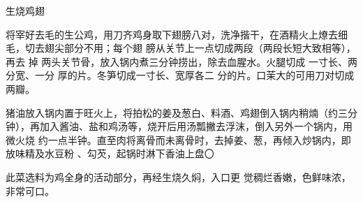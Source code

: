 \begin{recipe}[生烧大转弯]{生烧鸡翅}

\ingredients


\preparation

\step 将宰好去毛的生公鸡，用刀齐鸡身取下翅膀八对，洗净揩干，在酒精火上燎去细
毛，切去翅尖部分不用；每个翅 膀从关节上一点切成两段（两段长短大致相等），再去
掉 两头关节骨，放入锅内煮三分钟捞出，除去血腥水。火腿切成 一寸长、两分宽、一分
厚的片。冬笋切成一寸长、宽厚各二 分的片。口茉大的可用刀对切成两瓣。

\step 猪油放入锅内置于旺火上，将拍松的姜及葱白、料酒、鸡翅倒入锅内稍煵（约三分
钟），再加入酱油、盐和鸡汤等，烧开后用汤瓢撇去浮沫，倒入另外一个锅内，用微火烧
约一点半钟。直至肉将离骨而未离骨时，去掉姜、葱，再倾入炒锅内，即放味精及水豆粉
、勾芡，起锅时淋下香油上盘〇

\features

此菜选料为鸡全身的活动部分，再经生烧久焖，入口更 觉稠烂香嫩，色鲜味浓，非常可口。

\end{recipe}

